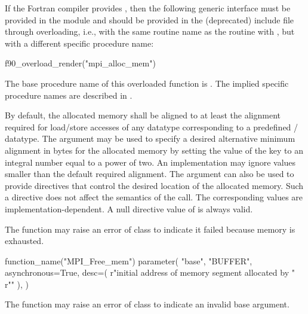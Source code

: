 If the Fortran compiler provides , 
then the following generic interface must be provided in the 
module and should be provided in the (deprecated)  include file through overloading, 
i.e., with the same routine name as the
routine with  , 
but with a different specific procedure name:

\begin{mpi-binding}
    f90_overload_render("mpi_alloc_mem")
\end{mpi-binding}
 
The base procedure name of this overloaded function is . The implied specific procedure names
are described in .

By default, the allocated memory shall be aligned to at least the alignment
required for load/store accesses of any datatype corresponding to a
predefined \MPI/ datatype.
%
The  argument may be used to specify a desired alternative minimum alignment in bytes for the
allocated memory by setting the value of the key  to an integral number
equal to a power of two.
An implementation may ignore values smaller than the default required alignment.
The  argument can also be used to provide
directives that control the desired location of the allocated memory.
Such a directive does not affect the semantics of the call.
The corresponding  values are
implementation-dependent. A null directive value of
\mpicode{ = } is always valid.

The  function  may raise an error of class
to indicate it failed because memory 
is exhausted.

\begin{mpi-binding}
    function_name("MPI_Free_mem")
    parameter(
        "base",
        "BUFFER",
        asynchronous=True,
        desc=(
            r"initial address of memory segment allocated by "
            r""
        ),
    )
\end{mpi-binding}

The function  may raise an error of class
 to indicate an invalid base argument.

